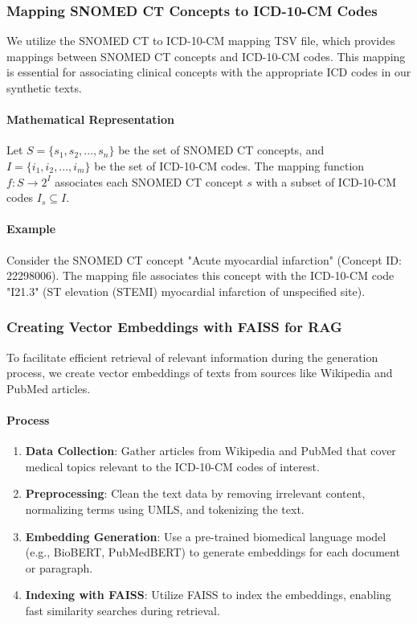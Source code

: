 \documentclass[12pt, a4paper]{article}
\begin{document}
\subsubsection{Mapping SNOMED CT Concepts to ICD-10-CM Codes}

We utilize the SNOMED CT to ICD-10-CM mapping TSV file, which provides mappings between SNOMED CT concepts and ICD-10-CM codes. This mapping is essential for associating clinical concepts with the appropriate ICD codes in our synthetic texts.

\paragraph{Mathematical Representation}

Let \( S = \{s_1, s_2, ..., s_n\} \) be the set of SNOMED CT concepts, and \( I = \{i_1, i_2, ..., i_m\} \) be the set of ICD-10-CM codes. The mapping function \( f: S \rightarrow 2^I \) associates each SNOMED CT concept \( s \) with a subset of ICD-10-CM codes \( I_s \subseteq I \).

\paragraph{Example}

Consider the SNOMED CT concept "Acute myocardial infarction" (Concept ID: 22298006). The mapping file associates this concept with the ICD-10-CM code "I21.3" (ST elevation (STEMI) myocardial infarction of unspecified site).

\subsubsection{Creating Vector Embeddings with FAISS for RAG}

To facilitate efficient retrieval of relevant information during the generation process, we create vector embeddings of texts from sources like Wikipedia and PubMed articles.

\paragraph{Process}

\begin{enumerate}
    \item \textbf{Data Collection}: Gather articles from Wikipedia and PubMed that cover medical topics relevant to the ICD-10-CM codes of interest.
    \item \textbf{Preprocessing}: Clean the text data by removing irrelevant content, normalizing terms using UMLS, and tokenizing the text.
    \item \textbf{Embedding Generation}: Use a pre-trained biomedical language model (e.g., BioBERT, PubMedBERT) to generate embeddings for each document or paragraph.
    \item \textbf{Indexing with FAISS}: Utilize FAISS to index the embeddings, enabling fast similarity searches during retrieval.
\end{enumerate}
\end{document}

